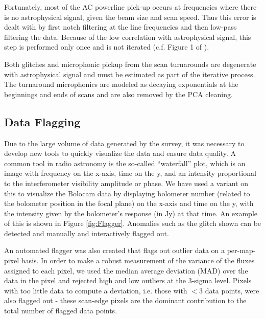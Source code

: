 \documentclass[12pt,preprint]{aastex}
\begin{document}
Fortunately, most of the AC powerline pick-up occurs at frequencies
where there is no astrophysical signal, given the beam size and scan
speed.  Thus this error is dealt with by first notch filtering at the
line frequencies and then low-pass filtering the data.  Because of the
low correlation with astrophysical signal, this step is performed only
once and is not iterated (c.f. Figure 1 of \citet{sayers09}).

Both glitches and microphonic pickup from the scan turnarounds are
degenerate with astrophysical signal and must be estimated as part of
the iterative process.  
The turnaround microphonics are modeled as decaying exponentials at the
beginnings and ends of scans and are also removed by the PCA cleaning.

\subsection{Data Flagging}

Due to the large volume of data generated by the survey, it was
necessary to develop new tools to quickly visualize the data and
ensure data quality.  A common tool in radio astronomy is the
so-called ``waterfall'' plot, which is an image with frequency on the
x-axis, time on the y, and an intensity proportional to the
interferometer visibility amplitude or phase.  We have used a variant
on this to visualize the Bolocam data by displaying bolometer number
(related to the bolometer position in the focal plane) on the x-axis
and time on the y, with the intensity given by the bolometer's
response (in Jy) at that time.  An example of this is shown in Figure
\ref{fig:Flagger}.  Anomalies such as the glitch shown
can be detected and manually and interactively flagged out.

An automated flagger was also created that flags out outlier data on a
per-map-pixel basis.  In order to make a robust measurement of the
variance of the fluxes assigned to each pixel, we used the median
average deviation (MAD) over the data in the pixel and rejected high and low
outliers at the 3-sigma level.  Pixels with too little data to compute
a deviation, i.e. those with $<3$ data points, were also flagged out -
these scan-edge pixels are the dominant contribution to the total
number of flagged data points.
\end{document}
